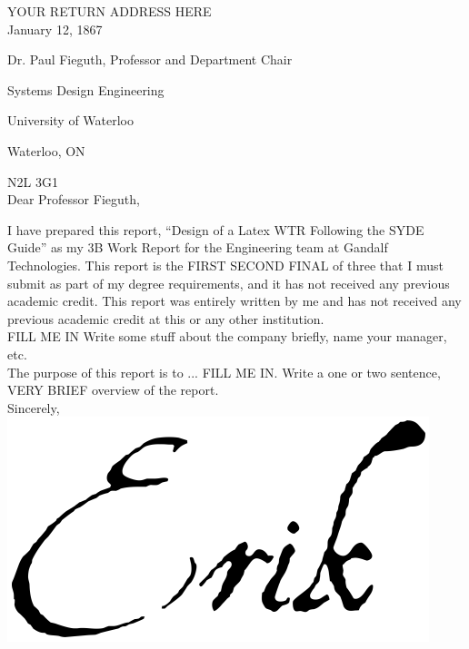 \documentclass[12pt]{article}
\title{\reportTitle}
\author{\studentName}
\date{\reportDueDate}
\def\reportTitle{Design of a Latex WTR Following the SYDE Guide}
\def\reportDueDate{January 12, 1867}
\def\company{Gandalf Technologies}
\begin{document}
	\startindent
	\makewtrtitle

	\stopindent
    \begin{singlespace}

		YOUR RETURN ADDRESS HERE \\

    	\reportDueDate

		Dr. Paul Fieguth, Professor and Department Chair
	
		Systems Design Engineering
	
	    University of Waterloo
	
	    Waterloo, ON
	
	    N2L 3G1\\
	
		Dear Professor Fieguth,
	\end{singlespace}
    
        I have prepared this report, “\reportTitle” as my 3B Work Report for the Engineering team at \company. This report is the FIRST SECOND FINAL of three that I must submit as part of my degree requirements, and it has not received any previous academic credit. This report was entirely written by me and has not received any previous academic credit at this or any other institution.\\
    	
    	FILL ME IN Write some stuff about the company briefly, name your manager, etc. \\
    	
    	The purpose of this report is to ... FILL ME IN. Write a one or two sentence, VERY BRIEF overview of the report. \\


	    \noindent
	    Sincerely,\\
	    \includegraphics[scale =0.2]{Signature}\\
    	
\end{document}
